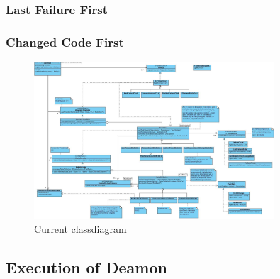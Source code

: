 \documentclass[i2]{oss}
\begin{document}
\subsubsection{Last Failure First}



\subsubsection{Changed Code First}



\begin{figure}[tbp]
\begin{center}
    \includegraphics[width=0.8\textwidth]{klassendiagram3}
    \caption{Current classdiagram}
	\label{fig:kd-h}
\end{center}
\end{figure}



\subsection{Execution of Deamon}
\end{document}
